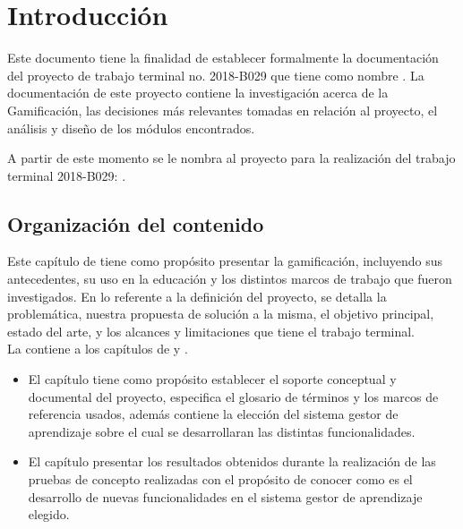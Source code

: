 \chapter{Introducción}
\label{ch:introduccion}

Este documento tiene la finalidad de establecer formalmente la documentación del proyecto de trabajo terminal no. 2018-B029 que tiene como nombre {\bf\TituloTT}. La documentación de este proyecto contiene la investigación acerca de la Gamificación, las decisiones más relevantes tomadas en relación al proyecto, el análisis y diseño de los módulos encontrados. %


\noindent A partir de este momento se le nombra {\bf\TituloProy} al proyecto para la realización del trabajo terminal 2018-B029: {\TituloTT}.

\section{Organización del contenido}

Este capítulo de  tiene como propósito presentar la gamificación, incluyendo sus antecedentes, su uso en la educación y los distintos marcos de trabajo que fueron investigados. En lo referente a la definición del proyecto, se detalla la problemática, nuestra propuesta de solución a la misma, %
el objetivo principal, estado del arte, y los alcances y limitaciones que tiene el trabajo terminal.\\

\noindent La  contiene a los capítulos de  y .

\begin{itemize}
    \item El capítulo  tiene como propósito establecer el soporte conceptual y documental del proyecto, especifica el glosario de términos y los marcos de referencia usados, además contiene la elección del sistema gestor de aprendizaje sobre el cual se desarrollaran las distintas funcionalidades.
    
    \item El capítulo  presentar los resultados obtenidos durante la realización de las pruebas de concepto realizadas con el propósito de conocer como es el desarrollo de nuevas funcionalidades en el sistema gestor de aprendizaje elegido.
\end{itemize}

